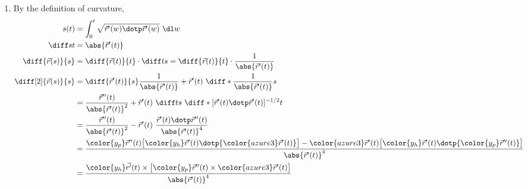 \begin{enumerate}
    \item By the definition of curvature,
          \begin{align}
              s(t)                    & = \int_{0}^{t} \sqrt{\vec{r}'(w)
              \dotp \vec{r}'(w)}\ \dl w                                            \\
              \diff st                & = \abs{\vec{r}'(t)}                        \\
              \diff{\vec{r}(s)}{s}    & = \diff{\vec{r}(t)}{t} \cdot \diff ts
              = \diff{\vec{r}(t)}{t} \cdot \frac{1}{\abs{\vec{r}'(t)}}             \\
              \diff[2]{\vec{r}(s)}{s} & = \diff{\vec{r}'(t)}{s}
              \frac{1}{\abs{\vec{r}'(t)}} + \vec{r}'(t)\
              \diff*{\frac{1}{\abs{\vec{r}'(t)}}}{s}                               \\
                                      & = \frac{\vec{r}''(t)}{\abs{\vec{r}'(t)}^2}
              + \vec{r}'(t)\ \diff ts\
              \diff*{[\vec{r}'(t) \dotp \vec{r}'(t)]^{-1/2}}{t}                    \\
                                      & = \frac{\vec{r}''(t)}{\abs{\vec{r}'(t)}^2}
              - \vec{r}'(t)\
              \frac{\vec{r}'(t) \dotp \vec{r}''(t)}{\abs{\vec{r}'(t)}^4}           \\
                                      & = \frac{{\color{y_p}\vec{r}''(t)}
              \big[ {\color{y_h}\vec{r}'(t)} \dotp
                  {\color{azure3}\vec{r}'(t)} \big]
              - {\color{azure3}\vec{r}'(t)}
              \big[ {\color{y_h}\vec{r}'(t)} \dotp
                  {\color{y_p}\vec{r}''(t)} \big]}
              {\abs{\vec{r}'(t)}^4}                                                \\
                                      & = \frac{{\color{y_h} \vec{r'}(t)} \times
                  \big[ {\color{y_p} \vec{r}''(t)}  \times
                      {\color{azure3} \vec{r}'(t)} \big]}
              {\abs{\vec{r}'(t)}^4}
          \end{align}


\end{enumerate}
